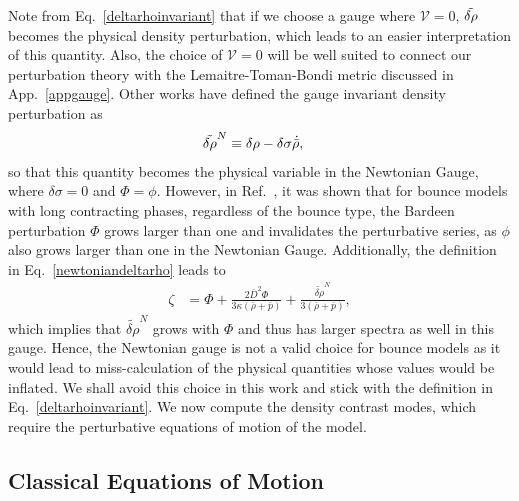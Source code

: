 \documentclass[a4paper,11pt]{article}
\begin{document}
Note from Eq.~\eqref{deltarhoinvariant} that if we choose a gauge where $\mathcal{V} =0$, $\Tilde{\delta\rho}$ becomes the physical density perturbation, which leads to an easier interpretation of this quantity. Also, the choice of $\mathcal{V} =0$ will be well suited to connect our perturbation theory with the Lemaitre-Toman-Bondi metric discussed in App.~\ref{appgauge}.  Other works have defined the gauge invariant density perturbation as
\begin{align}
	\label{newtoniandeltarho}
	\Tilde{\delta\rho}^{N} & \equiv \delta\rho - \delta\sigma \dot{\Bar{\rho}}
	,\end{align}
so that this quantity becomes the physical variable in the Newtonian Gauge, where $\delta\sigma = 0$ and $\Phi = \phi$. However, in Ref.~\cite{vitenti2012large}, it was shown that for bounce models with long contracting phases, regardless of the bounce type, the Bardeen perturbation $\Phi$ grows larger than one and invalidates the perturbative series, as $\phi$ also grows larger than one in the Newtonian Gauge. Additionally, the definition in Eq.~\eqref{newtoniandeltarho} leads to
\begin{align}
	\zeta & = \Phi + \frac{2\bar{D}^2 \Phi}{3  \kappa (\bar{\rho}+\bar{p})}+  \frac{{\tilde{\delta\rho}^N}} {3(\bar{\rho}+\bar{p})}
	,\end{align}
which implies that $\tilde{\delta\rho}^N$ grows with $\Phi$ and thus has larger spectra
as well in this gauge. Hence, the Newtonian gauge is not a valid choice for bounce
models as it would lead to miss-calculation of the physical quantities whose values
would be inflated. We shall avoid this choice in this work and stick with the definition
in Eq.~\eqref{deltarhoinvariant}. We now compute the density contrast modes, which
require the perturbative equations of motion of the model.

\subsection{Classical Equations of Motion}
\end{document}

